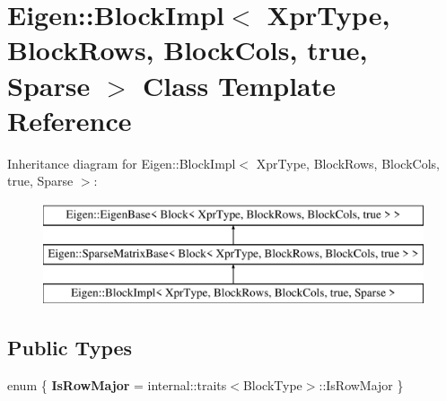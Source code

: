 \hypertarget{class_eigen_1_1_block_impl_3_01_xpr_type_00_01_block_rows_00_01_block_cols_00_01true_00_01_sparse_01_4}{}\section{Eigen\+::Block\+Impl$<$ Xpr\+Type, Block\+Rows, Block\+Cols, true, Sparse $>$ Class Template Reference}
\label{class_eigen_1_1_block_impl_3_01_xpr_type_00_01_block_rows_00_01_block_cols_00_01true_00_01_sparse_01_4}
Inheritance diagram for Eigen\+::Block\+Impl$<$ Xpr\+Type, Block\+Rows, Block\+Cols, true, Sparse $>$\+:\begin{figure}[H]
\begin{center}
\leavevmode
\includegraphics[height=3.000000cm]{class_eigen_1_1_block_impl_3_01_xpr_type_00_01_block_rows_00_01_block_cols_00_01true_00_01_sparse_01_4}
\end{center}
\end{figure}
\subsection*{Public Types}
\begin{DoxyCompactItemize}
\item 
\mbox{\label{class_eigen_1_1_block_impl_3_01_xpr_type_00_01_block_rows_00_01_block_cols_00_01true_00_01_sparse_01_4_a7fdda6e89195dc898588e2a020aefa8a}} 
enum \{ {\bfseries Is\+Row\+Major} = internal\+::traits$<$Block\+Type$>$\+::Is\+Row\+Major
 \}
\end{DoxyCompactItemize}
